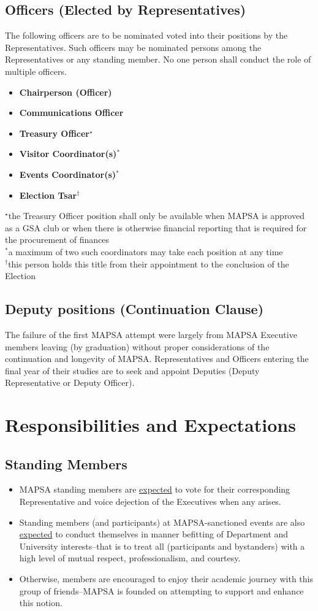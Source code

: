 \documentclass[8pt]{article}
\begin{document}
	\subsection{Officers (Elected by Representatives)}
	The following officers are to be nominated voted into their positions by the Representatives. Such officers may be nominated persons among the Representatives or any standing member. No one person shall conduct the role of multiple officers.
	\begin{itemize}
		\item \textbf{Chairperson (Officer)}
		\item \textbf{Communications Officer}
		\item \textbf{Treasury Officer$^\star$}
		\item \textbf{Visitor Coordinator(s)$^*$}
		\item \textbf{Events Coordinator(s)$^*$}
		\item \textbf{Election Tsar$^\dagger$}
	\end{itemize}
	$^\star$the Treasury Officer position shall only be available when MAPSA is approved as a GSA club or when there is otherwise financial reporting that is required for the procurement of finances\\
	$^*$a maximum of two such coordinators may take each position at any time\\
	$^\dagger$this person holds this title from their appointment to the conclusion of the Election
	\subsection{Deputy positions (Continuation Clause)}
	The failure of the first MAPSA attempt were largely from MAPSA Executive members leaving (by graduation) without proper considerations of the continuation and longevity of MAPSA. Representatives and Officers entering the final year of their studies are to seek and appoint Deputies (Deputy Representative or Deputy Officer).
	\section{Responsibilities and Expectations}
	\subsection{Standing Members}
	\begin{itemize}
		\item MAPSA standing members are \underline{expected} to vote for their corresponding Representative and voice dejection of the Executives when any arises. 
		\item Standing members (and participants) at MAPSA-sanctioned events are also \underline{expected} to conduct themselves in manner befitting of Department and University interests--that is to treat all (participants and bystanders) with a high level of mutual respect, professionalism, and courtesy. 
		\item Otherwise, members are encouraged to enjoy their academic journey with this group of friends--MAPSA is founded on attempting to support and enhance this notion.
	\end{itemize}
\end{document}
